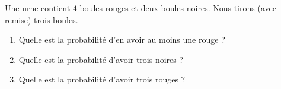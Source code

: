 
\begin{exercice}\label{exoPremiere-0090}

    Une urne contient \( 4\) boules rouges et deux boules noires. Nous tirons (avec remise) trois boules.
    \begin{enumerate}
        \item
            Quelle est la probabilité d'en avoir au moins une rouge ?
        \item
            Quelle est la probabilité d'avoir trois noires ?
        \item
            Quelle est la probabilité d'avoir trois rouges ?
    \end{enumerate}

\end{exercice}
